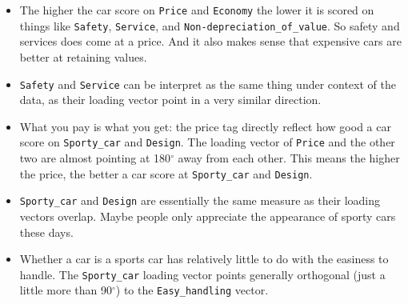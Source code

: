 \documentclass[]{article}
\begin{document}
\begin{itemize}
\item
  The higher the car score on \texttt{Price} and \texttt{Economy} the
  lower it is scored on things like \texttt{Safety}, \texttt{Service},
  and \texttt{Non-depreciation\_of\_value}. So safety and services does
  come at a price. And it also makes sense that expensive cars are
  better at retaining values.
\item
  \texttt{Safety} and \texttt{Service} can be interpret as the same
  thing under context of the data, as their loading vector point in a
  very similar direction.
\item
  What you pay is what you get: the price tag directly reflect how good
  a car score on \texttt{Sporty\_car} and \texttt{Design}. The loading
  vector of \texttt{Price} and the other two are almost pointing at
  180\(^\circ\) away from each other. This means the higher the price,
  the better a car score at \texttt{Sporty\_car} and \texttt{Design}.
\item
  \texttt{Sporty\_car} and \texttt{Design} are essentially the same
  measure as their loading vectors overlap. Maybe people only appreciate
  the appearance of sporty cars these days.
\item
  Whether a car is a sports car has relatively little to do with the
  easiness to handle. The \texttt{Sporty\_car} loading vector points
  generally orthogonal (just a little more than 90\(^\circ\)) to the
  \texttt{Easy\_handling} vector.
\end{itemize}
\end{document}
